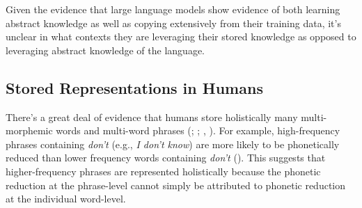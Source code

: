 \documentclass[
  12pt,
  letterpaper,
]{scrreport}
\begin{document}
Given the evidence that large language models show evidence of both
learning abstract knowledge as well as copying extensively from their
training data, it's unclear in what contexts they are leveraging their
stored knowledge as opposed to leveraging abstract knowledge of the
language.

\subsection{Stored Representations in
Humans}\label{stored-representations-in-humans}

There's a great deal of evidence that humans store holistically many
multi-morphemic words and multi-word phrases
(;
;
,
). For example,
high-frequency phrases containing \emph{don't} (e.g., \emph{I don't
know}) are more likely to be phonetically reduced than lower frequency
words containing \emph{don't}
().
This suggests that higher-frequency phrases are represented holistically
because the phonetic reduction at the phrase-level cannot simply be
attributed to phonetic reduction at the individual word-level.
\end{document}
